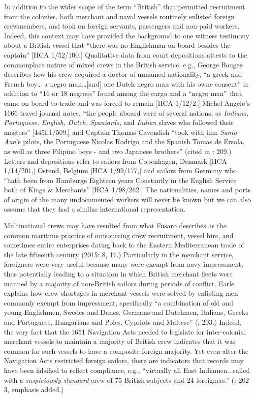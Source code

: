   In addition to the wider scope of the term “British” that permitted recruitment from the colonies, both merchant and naval vessels routinely enlisted foreign crewmembers, and took on foreign servants, passengers and non-paid workers. Indeed, this context may have provided the background to one witness testimony about a British vessel that “there was no Englishman on board besides the captain” [HCA 1/52/100.] Qualitative data from court depositions attests to the commonplace nature of mixed crews in the British service, e.g., George Bougee describes how his crew acquired a doctor of unnamed nationality, “a greek and French boy… a negro man…[and] one Dutch negro man with his owne consent” in addition to “16 or 18 negroes” found among the cargo and a “negro man” that came on board to trade and was forced to remain [HCA 1/12/2.] Michel Angelo’s 1666 travel journal notes, “the people aboard were of several nations, as \textit{Indians,} \textit{Portuguese,} \textit{English,} \textit{Dutch,} \textit{Spaniards,} and \textit{Indian} slaves who followed their masters” [445f.1/509,] and Captain Thomas Cavendish “took with him \textit{Santa} \textit{Ana}’s pilots, the Portuguese Nicolas Rodrigo and the Spanish Tomas de Ersola, as well as three Filipino boys - and two Japanese brothers” (cited in \citealt{Bicheno2012}: 209.) Letters and depositions refer to sailors from Copenhagen, Denmark [HCA 1/14/201,] Ostend, Belgium [HCA 1/99/177,] and sailors from Germany who “hath been from Hamburge Eighteen years Constantly in the English Service both of Kings \& Merchants” [HCA 1/98/262.] The nationalities, names and ports of origin of the many undocumented workers will never be known but we can also assume that they had a similar international representation.

Multinational crews may have resulted from what Fusaro describes as the common maritime practice of outsourcing crew recruitment, vessel hire, and sometimes entire enterprises dating back to the Eastern Mediterranean trade of the late fifteenth century (2015: 8, 17.) Particularly in the merchant service, foreigners were very useful because many were exempt from navy impressment, thus potentially leading to a situation in which British merchant fleets were manned by a majority of non-British sailors during periods of conflict. Earle explains how crew shortages in merchant vessels were solved by enlisting men commonly exempt from impressment, specifically “a combination of old and young Englishmen, Swedes and Danes, Germans and Dutchmen, Italians, Greeks and Portuguese, Hungarians and Poles, Cypriots and Maltese” (\citealt{Earle1998}: 203.) Indeed, the very fact that the 1651 Navigation Acts needed to legislate for inter-colonial merchant vessels to maintain a majority of British crew indicates that it was common for such vessels to have a composite foreign majority. Yet even after the Navigation Acts restricted foreign sailors, there are indicators that records may have been falsified to reflect compliance, e.g., “virtually all East Indiamen...sailed with a \textit{suspiciously} \textit{standard} crew of 75 British subjects and 24 foreigners.” (\citealt{Earle1998}: 202-3, emphasis added.) 

